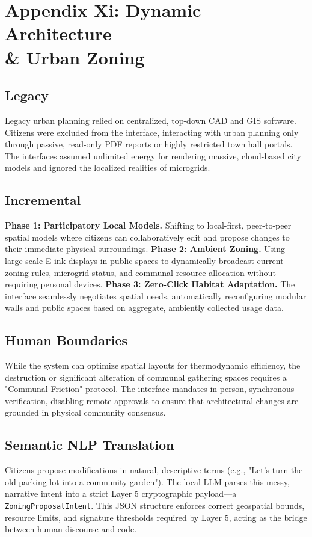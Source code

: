\chapter{Appendix Xi: Dynamic Architecture \\\& Urban Zoning}

\section{Legacy}
Legacy urban planning relied on centralized, top-down CAD and GIS software. Citizens were excluded from the interface, interacting with urban planning only through passive, read-only PDF reports or highly restricted town hall portals. The interfaces assumed unlimited energy for rendering massive, cloud-based city models and ignored the localized realities of microgrids.

\section{Incremental}
\textbf{Phase 1: Participatory Local Models.} Shifting to local-first, peer-to-peer spatial models where citizens can collaboratively edit and propose changes to their immediate physical surroundings.
\textbf{Phase 2: Ambient Zoning.} Using large-scale E-ink displays in public spaces to dynamically broadcast current zoning rules, microgrid status, and communal resource allocation without requiring personal devices.
\textbf{Phase 3: Zero-Click Habitat Adaptation.} The interface seamlessly negotiates spatial needs, automatically reconfiguring modular walls and public spaces based on aggregate, ambiently collected usage data.

\section{Human Boundaries}
While the system can optimize spatial layouts for thermodynamic efficiency, the destruction or significant alteration of communal gathering spaces requires a "Communal Friction" protocol. The interface mandates in-person, synchronous verification, disabling remote approvals to ensure that architectural changes are grounded in physical community consensus.

\section{Semantic NLP Translation}
Citizens propose modifications in natural, descriptive terms (e.g., "Let's turn the old parking lot into a community garden"). The local LLM parses this messy, narrative intent into a strict Layer 5 cryptographic payload—a \texttt{ZoningProposalIntent}. This JSON structure enforces correct geospatial bounds, resource limits, and signature thresholds required by Layer 5, acting as the bridge between human discourse and code.

